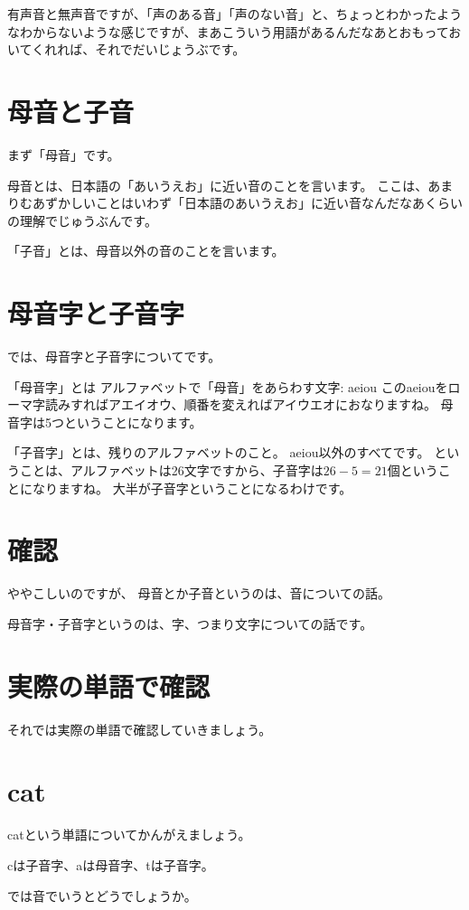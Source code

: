 \documentclass[book,jafontscale=0.9247]{jlreq}
\begin{document}
有声音と無声音ですが、「声のある音」「声のない音」と、ちょっとわかったようなわからないような感じですが、まあこういう用語があるんだなあとおもっておいてくれれば、それでだいじょうぶです。




\section{母音と子音}
まず「母音」です。

母音とは、日本語の「あいうえお」に近い音のことを言います。
ここは、あまりむあずかしいことはいわず「日本語のあいうえお」に近い音なんだなあくらいの理解でじゅうぶんです。

「子音」とは、母音以外の音のことを言います。

\section{母音字と子音字}
では、母音字と子音字についてです。

「母音字」とは アルファベットで「母音」をあらわす文字: aeiou
このaeiouをローマ字読みすればアエイオウ、順番を変えればアイウエオにおなりますね。
母音字は5つということになります。

「子音字」とは、残りのアルファベットのこと。
aeiou以外のすべてです。
ということは、アルファベットは26文字ですから、子音字は$26-5=21$個ということになりますね。
大半が子音字ということになるわけです。

\section{確認}

ややこしいのですが、
母音とか子音というのは、音についての話。

母音字・子音字というのは、字、つまり文字についての話です。

\section{実際の単語で確認}
それでは実際の単語で確認していきましょう。

\section{cat}

catという単語についてかんがえましょう。

cは子音字、aは母音字、tは子音字。

では音でいうとどうでしょうか。
\end{document}
